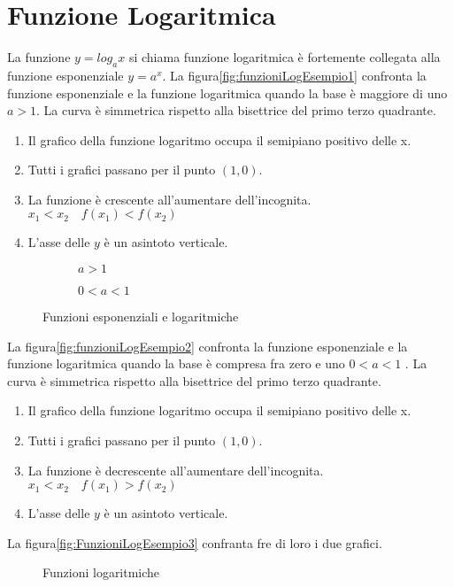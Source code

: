 \section{Funzione Logaritmica}
\label{Funzione Logaritmica}
La funzione $y=log_ax$ si chiama funzione logaritmica è fortemente collegata alla funzione esponenziale $y=a^x$. La figura\nobs\vref{fig:funzioniLogEsempio1} confronta la funzione esponenziale e la funzione logaritmica  quando la base è maggiore di uno $a>1$. La curva è simmetrica rispetto alla bisettrice del primo terzo quadrante. 
\begin{enumerate}
	\item Il grafico della funzione logaritmo occupa il semipiano positivo delle x.
	\item Tutti i grafici passano per il punto $(1,0)$.
	\item La funzione è crescente all'aumentare dell'incognita. $x_1<x_2\quad f(x_1)<f(x_2)$ 
	\item L'asse delle $y$ è un asintoto verticale.
\end{enumerate} 
\begin{figure}
	\centering
	\begin{subfigure}[b]{.4\linewidth}
		\centering
	
		\caption{$a>1$}
		\label{fig:funzioniLogEsempio1}
	\end{subfigure}\qquad
	\centering
	\begin{subfigure}[b]{.4\linewidth}
		\centering
	
		\caption{$0<a<1$}
		\label{fig:funzioniLogEsempio2}
	\end{subfigure}%
	\caption{Funzioni esponenziali e logaritmiche}
	\label{fig:funzExp1}
\end{figure}
La figura\nobs\vref{fig:funzioniLogEsempio2} confronta la funzione esponenziale e la funzione logaritmica  quando la base è compresa fra zero e uno $0<a<1$ . La curva è simmetrica rispetto alla bisettrice del primo terzo quadrante. 
\begin{enumerate}
	\item Il grafico della funzione logaritmo occupa il semipiano positivo delle x.
	\item Tutti i grafici passano per il punto $(1,0)$.
	\item La funzione è decrescente all'aumentare dell'incognita. $x_1<x_2\quad f(x_1)>f(x_2)$ 
	\item L'asse delle $y$ è un asintoto verticale.
\end{enumerate}
La figura\nobs\vref{fig:FunzioniLogEsempio3} confranta fre di loro i due grafici.
\begin{figure}
\centering

\caption{Funzioni logaritmiche}
\label{fig:FunzioniLogEsempio3}
\end{figure}
